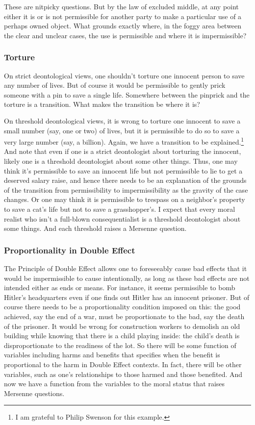 These are nitpicky questions. But by the law of excluded middle, at any point either it is or is not permissible 
for another party to make a 
particular use of a perhaps owned object. What grounds exactly where, in the foggy area between the clear and unclear cases, the
use is permissible and where it is impermissible? 

\subsubsection{Torture}
On strict deontological views, one shouldn't torture one innocent person to save any number of lives. But of course
it would be permissible to gently prick someone with a pin to save a single life. Somewhere between the pinprick
and the torture is a transition. What makes the transition be where it is?

On threshold deontological views, it is wrong to torture one innocent to save a small number (say, one or two) of lives,
but it is permissible to do so to save a very large number (say, a billion). Again, we have a transition to be 
explained.\footnote{I am grateful to Philip Swenson for this example.} And note that even if one is a strict deontologist
about torturing the innocent, likely one is a threshold deontologist about some other things. Thus, one may think it's
permissible to save an innocent life but not permissible to lie to get a deserved salary raise,
and hence there needs to be an explanation of the grounds of the transition from permissibility to impermissibility
as the gravity of the case changes. Or
one may think it is permissible to trespass on a neighbor's property to save a cat's life but not to save a grasshopper's.
I expect that every moral realist who isn't a full-blown consequentialist is a threshold deontologist about some things.
And each threshold raises a Mersenne question.

\subsubsection{Proportionality in Double Effect}
The Principle of Double Effect allows one to foreseeably cause bad effects that it would
be impermissible to cause intentionally, as long as these bad effects are not intended either as ends or means. For instance, it seems permissible to bomb Hitler's headquarters even
if one finds out Hitler has an innocent prisoner. But of course there needs to be a proportionality
condition imposed on this: the good achieved, say the end of a war, must be proportionate to the bad, say the death of the prisoner. 
It would be wrong for construction workers to demolish an old building while knowing that there is a child playing inside: 
the child's death is disproportionate to the readiness of the lot. So there will be some function of variables including harms and benefits that
specifies when the benefit is proportional to the harm in Double Effect contexts. In fact, there will be other variables, such as
one's relationships to those harmed and those benefited.  And now we have a function from the variables to the moral
status that raises Mersenne questions.

